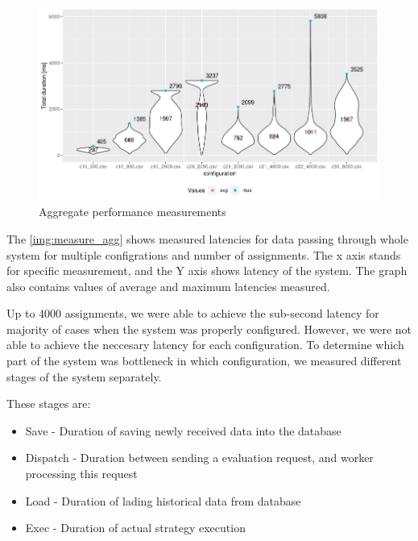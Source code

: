 \begin{figure}[H]
    \includegraphics[width=\textwidth]{obrazky-figures/agg.png}
    \caption{Aggregate performance measurements}
    \label{img:measure_agg}
\end{figure}
The \autoref{img:measure_agg} shows measured latencies for data passing through whole system for multiple configrations and
number of assignments. The x axis stands for specific measurement, and the Y axis shows latency of the system. The graph
also contains values of average and maximum latencies measured.

Up to 4000 assignments, we were able to achieve the sub-second latency for majority of cases when the system was properly configured.
However, we were not able to achieve the neccesary latency for each configuration. To determine which part of the system
was bottleneck in which configuration, we measured different stages of the system separately.

These stages are:
\begin{itemize}
    \item{Save} - Duration of saving newly received data into the database
    \item{Dispatch} - Duration between sending a evaluation request, and worker processing this request
    \item{Load} - Duration of lading historical data from database
    \item{Exec} - Duration of actual strategy execution
\end{itemize}

